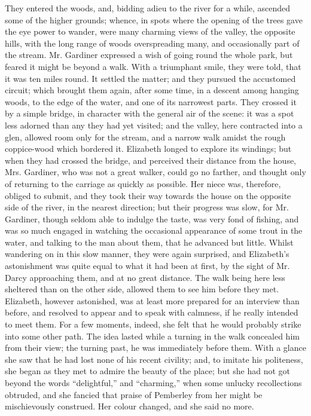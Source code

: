 \documentclass[10pt]{book}
\begin{document}
   They entered the woods, and, bidding adieu to the river for a while,
ascended some of the higher grounds; whence, in spots where the opening
of the trees gave the eye power to wander, were many charming views of
the valley, the opposite hills, with the long range of woods
overspreading many, and occasionally part of the stream. Mr. Gardiner
expressed a wish of going round the whole park, but feared it might be
beyond a walk. With a triumphant smile, they were told, that it was ten
miles round. It settled the matter; and they pursued the accustomed
circuit; which brought them again, after some time, in a descent among
hanging woods, to the edge of the water, and one of its narrowest parts.
They crossed it by a simple bridge, in character with the general air of
the scene: it was a spot less adorned than any they had yet visited; and
the valley, here contracted into a glen, allowed room only for the
stream, and a narrow walk amidst the rough coppice-wood which bordered
it. Elizabeth longed to explore its windings; but when they had crossed
the bridge, and perceived their distance from the house, Mrs. Gardiner,
who was not a great walker, could go no farther, and thought only of
returning to the carriage as quickly as possible. Her niece was,
therefore, obliged to submit, and they took their way towards the house
on the opposite side of the river, in the nearest direction; but their
progress was
   slow, for Mr. Gardiner, though seldom able to indulge the
taste, was very fond of fishing, and was so much engaged in watching the
occasional appearance of some trout in the water, and talking to the man
about them, that he advanced but little. Whilst wandering on in this
slow manner, they were again surprised, and Elizabeth’s astonishment was
quite equal to what it had been at first, by the sight of Mr. Darcy
approaching them, and at no great distance. The walk being here less
sheltered than on the other side, allowed them to see him before they
met. Elizabeth, however astonished, was at least more prepared for an
interview than before, and resolved to appear and to speak with
calmness, if he really intended to meet them. For a few moments, indeed,
she felt that he would probably strike into some other path. The idea
lasted while a turning in the walk concealed him from their view; the
turning past, he was immediately before them. With a glance she saw that
he had lost none of his recent civility; and, to imitate his politeness,
she began as they met to admire the beauty of the place; but she had not
got beyond the words “delightful,” and “charming,” when some unlucky
recollections obtruded, and she fancied that praise of Pemberley from
her might be mischievously construed. Her colour changed, and she said
no more.
  
\end{document}
